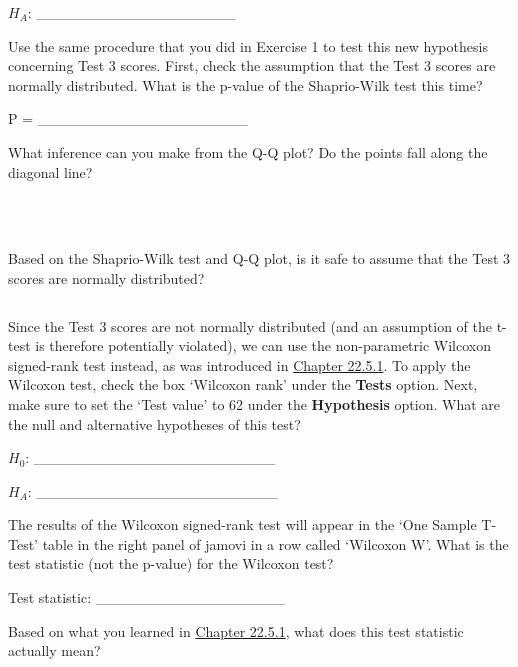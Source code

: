 \documentclass[
]{scrbook}
\begin{document}
\(H_{A}\): \_\_\_\_\_\_\_\_\_\_\_\_\_\_\_\_\_\_\_

Use the same procedure that you did in Exercise 1 to test this new hypothesis concerning Test 3 scores.
First, check the assumption that the Test 3 scores are normally distributed.
What is the p-value of the Shaprio-Wilk test this time?

P = \_\_\_\_\_\_\_\_\_\_\_\_\_\_\_\_\_\_\_\_

What inference can you make from the Q-Q plot?
Do the points fall along the diagonal line?

\begin{verbatim}



\end{verbatim}

Based on the Shaprio-Wilk test and Q-Q plot, is it safe to assume that the Test 3 scores are normally distributed?

\begin{verbatim}

\end{verbatim}

Since the Test 3 scores are not normally distributed (and an assumption of the t-test is therefore potentially violated), we can use the non-parametric Wilcoxon signed-rank test instead, as was introduced in \protect\hyperlink{wilcoxon-test}{Chapter 22.5.1}.
To apply the Wilcoxon test, check the box `Wilcoxon rank' under the \textbf{Tests} option.
Next, make sure to set the `Test value' to 62 under the \textbf{Hypothesis} option.
What are the null and alternative hypotheses of this test?

\(H_{0}\): \_\_\_\_\_\_\_\_\_\_\_\_\_\_\_\_\_\_\_\_\_\_\_

\(H_{A}\): \_\_\_\_\_\_\_\_\_\_\_\_\_\_\_\_\_\_\_\_\_\_\_

The results of the Wilcoxon signed-rank test will appear in the `One Sample T-Test' table in the right panel of jamovi in a row called `Wilcoxon W'.
What is the test statistic (not the p-value) for the Wilcoxon test?

Test statistic: \_\_\_\_\_\_\_\_\_\_\_\_\_\_\_\_\_\_

Based on what you learned in \protect\hyperlink{wilcoxon-test}{Chapter 22.5.1}, what does this test statistic actually mean?

\begin{verbatim}



\end{verbatim}
\end{document}
